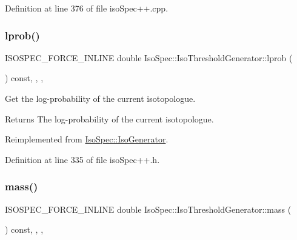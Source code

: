Definition at line 376 of file iso\+Spec++.\+cpp.

\mbox{\label{class_iso_spec_1_1_iso_threshold_generator_a4aeebde03e385404d0175fd5696ff529}} 
\subsubsection{\texorpdfstring{lprob()}{lprob()}}
{\footnotesize\ttfamily I\+S\+O\+S\+P\+E\+C\+\_\+\+F\+O\+R\+C\+E\+\_\+\+I\+N\+L\+I\+NE double Iso\+Spec\+::\+Iso\+Threshold\+Generator\+::lprob (\begin{DoxyParamCaption}{ }\end{DoxyParamCaption}) const\hspace{0.3cm}{\ttfamily [inline]}, {\ttfamily [final]}, {\ttfamily [override]}, {\ttfamily [virtual]}}



Get the log-\/probability of the current isotopologue. 

\begin{DoxyReturn}{Returns}
The log-\/probability of the current isotopologue. 
\end{DoxyReturn}


Reimplemented from \mbox{\hyperlink{class_iso_spec_1_1_iso_generator_ae8e24abbce51a4c93994f630acfdf383}{Iso\+Spec\+::\+Iso\+Generator}}.



Definition at line 335 of file iso\+Spec++.\+h.

\mbox{\label{class_iso_spec_1_1_iso_threshold_generator_ae2236accc7dc7a25a723e3c7317659b6}} 
\subsubsection{\texorpdfstring{mass()}{mass()}}
{\footnotesize\ttfamily I\+S\+O\+S\+P\+E\+C\+\_\+\+F\+O\+R\+C\+E\+\_\+\+I\+N\+L\+I\+NE double Iso\+Spec\+::\+Iso\+Threshold\+Generator\+::mass (\begin{DoxyParamCaption}{ }\end{DoxyParamCaption}) const\hspace{0.3cm}{\ttfamily [inline]}, {\ttfamily [final]}, {\ttfamily [override]}, {\ttfamily [virtual]}}



